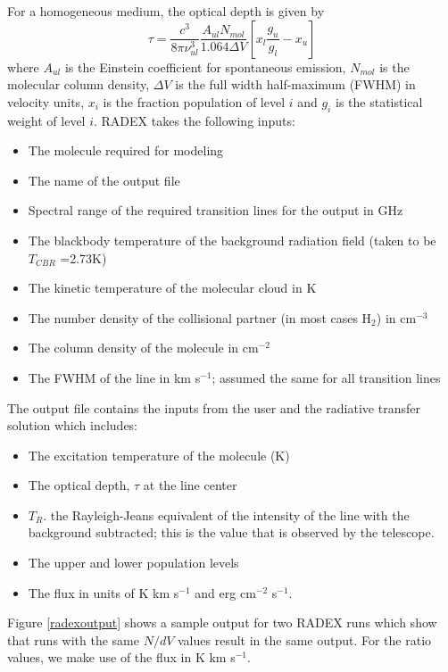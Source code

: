 For a homogeneous medium, the optical depth is given by
\begin{equation}
\tau = \frac{c^{3}}{8\pi \nu_{ul}^{3}} \frac{A_{ul}N_{mol}}{1.064\Delta V} \left[ x_{l}\frac{g_{u}}{g_{l}} -x_{u}\right]
\end{equation}
where $A_{ul}$ is the Einstein coefficient for spontaneous emission, $N_{mol}$ is the molecular column density, $\Delta V$ is the full width half-maximum (FWHM) in velocity units, $x_{i}$ is the fraction population of level $i$ and $g_{i}$ is the statistical weight of level $i$.  
RADEX takes the following inputs:
\begin{itemize}
\item The molecule required for modeling 
\item The name of the output file
\item Spectral range of the required transition lines for the output in GHz 
\item The blackbody temperature of the background radiation field (taken to be $T_{CBR}$ =2.73K)
\item The kinetic temperature of the molecular cloud in K 
\item The number density of the collisional partner (in most cases H$_{2}$) in cm$^{-3}$
\item The column density of the molecule in cm$^{-2}$
\item The FWHM of the line in km s$^{-1}$; assumed the same for all transition lines
\end{itemize}
The output file contains the inputs from the user and the radiative transfer solution which includes:
\begin{itemize}
\item The excitation temperature of the molecule (K)
\item The optical depth, $\tau$ at the line center 
\item $T_{R}$. the Rayleigh-Jeans equivalent of the intensity of the line with the background subtracted; this is the value that is observed by the telescope.
\item The upper and lower population levels
\item The flux in units of K km s$^{-1}$ and erg cm$^{-2}$ s$^{-1}$.
\end{itemize}
Figure \ref{radexoutput} shows a sample output for two RADEX runs which show that runs with the same $N/dV$ values result in the same output. For the ratio values, we make use of the flux in K km s$^{-1}$. 




